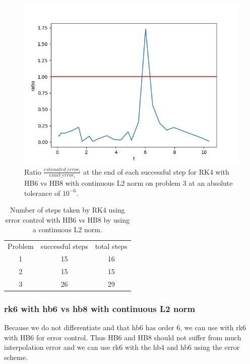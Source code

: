 \begin{figure}[H]
\centering
\includegraphics[width=0.7\linewidth]{./figures/rk4_with_hb6_hb8_L2norm_p3_error_ratio}
\caption{Ratio $\frac{estimated\_error_i}{exact\_error_i}$ at the end of each successful step for RK4 with HB6 vs HB8 with continuous L2 norm on problem 3 at an absolute tolerance of $10^{-6}$.}
\label{fig:rk4_with_hb6_hb8_L2norm_p3_error_ratio}
\end{figure}

\begin{table}[h]
\caption {Number of steps taken by RK4 using error control with HB6 vs HB8 by using a continuous L2 norm.} \label{tab:rk4_with_hb6_hb8_L2norm_nsteps}
\begin{center}
\begin{tabular}{ c c c } 
Problem & successful steps & total steps \\ 
1       & 15                         & 16 \\ 
2       & 15                         & 15 \\
3       & 26                         & 29 \\
\end{tabular}
\end{center}
\end{table}


\subsubsection{rk6 with hb6 vs hb8 with continuous L2 norm}
Because we do not differentiate and that hb6 has order 6, we can use with rk6 with HB6 for error control. Thus HB6 and HB8 should not suffer from much interpolation error and we can use rk6 with the hb4 and hb6 using the error scheme.

